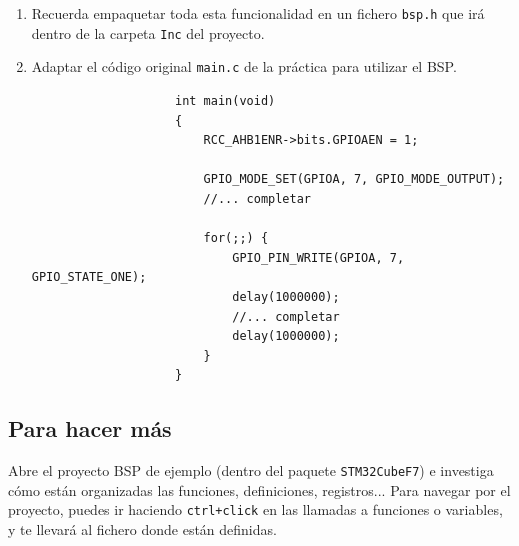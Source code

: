 \documentclass[../main.tex]{subfiles}
\begin{document}
\begin{enumerate}
                \begin{lstlisting}
                    static inline void GPIO_MODE_SET(volatile GPIO_TypeDef *GPIOx, uint32_t pin, GPIO_Mode_t mode);
                    static inline void GPIO_OTYPE_SET(volatile GPIO_TypeDef *GPIOx, uint32_t pin, GPIO_OType_t otype);
                    static inline void GPIO_OSPEED_SET(volatile GPIO_TypeDef *GPIOx, uint32_t pin, GPIO_OSpeed_t ospeed);
                    static inline void GPIO_PUPD_SET(volatile GPIO_TypeDef *GPIOx, uint32_t pin, GPIO_PuPd_t pupd);
                    static inline void GPIO_PIN_WRITE(volatile GPIO_TypeDef *GPIOx, uint32_t pin, GPIO_State_t state);
                \end{lstlisting}
            \item Recuerda empaquetar toda esta funcionalidad en un fichero \texttt{bsp.h} que irá dentro de la carpeta \texttt{Inc} del proyecto.
            \item Adaptar el código original \texttt{main.c} de la práctica para utilizar el BSP.
                
                \begin{lstlisting}
                    int main(void)
                    {
                        RCC_AHB1ENR->bits.GPIOAEN = 1;

                        GPIO_MODE_SET(GPIOA, 7, GPIO_MODE_OUTPUT);
                        //... completar

                        for(;;) {
                            GPIO_PIN_WRITE(GPIOA, 7, GPIO_STATE_ONE);
                            delay(1000000);
                            //... completar
                            delay(1000000);
                        }
                    }
                \end{lstlisting}
        \end{enumerate}
        

    \subsection{Para hacer más}
        
        Abre el proyecto BSP de ejemplo (dentro del paquete \texttt{STM32CubeF7}) e investiga cómo están organizadas las funciones, definiciones, registros... Para navegar por el proyecto, puedes ir haciendo \texttt{ctrl+click} en las llamadas a funciones o variables, y te llevará al fichero donde están definidas.
\end{document}
